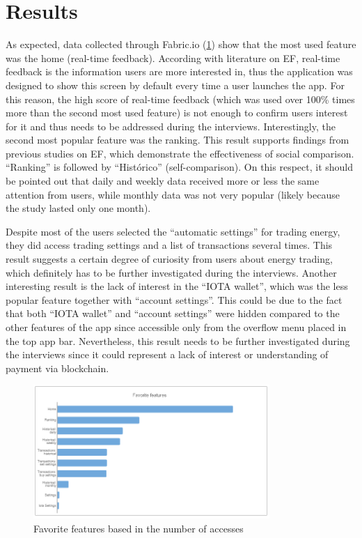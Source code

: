  \section{Results}
 As expected, data collected through Fabric.io (\cref{fig:gr1}) show that the most used feature was the home (real-time feedback). According with literature on \ac{EF}, real-time feedback is the information users are more interested in, thus the application was designed to show this screen by default every time a user launches the app. For this reason, the high score of real-time feedback (which was used over 100\% times more than the second most used feature) is not enough to confirm users interest for it and thus needs to be addressed during the interviews. Interestingly, the second most popular feature was the ranking. This result supports findings from previous studies on \ac{EF}, which demonstrate the effectiveness of social comparison. “Ranking” is followed by  “Histórico” (self-comparison). On this respect, it should be pointed out that daily and weekly data received more or less the same attention from users, while monthly data was not very popular (likely because the study lasted only one month).


Despite most of the users selected the “automatic settings” for trading energy,  they did access trading settings and a list of transactions several times. This result suggests a certain degree of curiosity from users about energy trading, which definitely has to be further investigated during the interviews. Another interesting result is the lack of interest in the “IOTA wallet”, which was the less popular feature together with “account settings”. This could be due to the fact that both “IOTA wallet” and “account settings” were hidden compared to the other features of the app since accessible only from the overflow menu placed in the top app bar. Nevertheless, this result needs to be further investigated during the interviews since it could represent a lack of interest or understanding of payment via blockchain. 

 
 \begin{figure}[h]
\centering
\includegraphics[width=0.8\textwidth]{./Images/graph1}
\caption{Favorite features based in the number of accesses}
\label{fig:gr1}
\end{figure}

